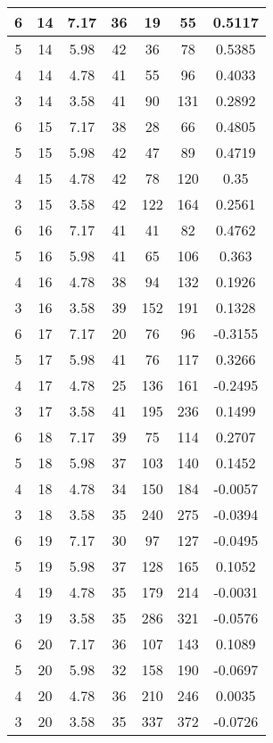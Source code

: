 \documentclass[letterpaper, 12pt]{article}
\begin{document}
\begin{longtable}{|c|c|c|c|c|c|c|}
\hline
6 & 14 & 7.17 & 36 & 19 & 55 & 0.5117 \\
\hline
5 & 14 & 5.98 & 42 & 36 & 78 & 0.5385 \\
\hline
4 & 14 & 4.78 & 41 & 55 & 96 & 0.4033 \\
\hline
3 & 14 & 3.58 & 41 & 90 & 131 & 0.2892 \\
\hline
6 & 15 & 7.17 & 38 & 28 & 66 & 0.4805 \\
\hline
5 & 15 & 5.98 & 42 & 47 & 89 & 0.4719 \\
\hline
4 & 15 & 4.78 & 42 & 78 & 120 & 0.35 \\
\hline
3 & 15 & 3.58 & 42 & 122 & 164 & 0.2561 \\
\hline
6 & 16 & 7.17 & 41 & 41 & 82 & 0.4762 \\
\hline
5 & 16 & 5.98 & 41 & 65 & 106 & 0.363 \\
\hline
4 & 16 & 4.78 & 38 & 94 & 132 & 0.1926 \\
\hline
3 & 16 & 3.58 & 39 & 152 & 191 & 0.1328 \\
\hline
6 & 17 & 7.17 & 20 & 76 & 96 & -0.3155 \\
\hline
5 & 17 & 5.98 & 41 & 76 & 117 & 0.3266 \\
\hline
4 & 17 & 4.78 & 25 & 136 & 161 & -0.2495 \\
\hline
3 & 17 & 3.58 & 41 & 195 & 236 & 0.1499 \\
\hline
6 & 18 & 7.17 & 39 & 75 & 114 & 0.2707 \\
\hline
5 & 18 & 5.98 & 37 & 103 & 140 & 0.1452 \\
\hline
4 & 18 & 4.78 & 34 & 150 & 184 & -0.0057 \\
\hline
3 & 18 & 3.58 & 35 & 240 & 275 & -0.0394 \\
\hline
6 & 19 & 7.17 & 30 & 97 & 127 & -0.0495 \\
\hline
5 & 19 & 5.98 & 37 & 128 & 165 & 0.1052 \\
\hline
4 & 19 & 4.78 & 35 & 179 & 214 & -0.0031 \\
\hline
3 & 19 & 3.58 & 35 & 286 & 321 & -0.0576 \\
\hline
6 & 20 & 7.17 & 36 & 107 & 143 & 0.1089 \\
\hline
5 & 20 & 5.98 & 32 & 158 & 190 & -0.0697 \\
\hline
4 & 20 & 4.78 & 36 & 210 & 246 & 0.0035 \\
\hline
3 & 20 & 3.58 & 35 & 337 & 372 & -0.0726 \\
\hline
\end{longtable}
\end{document}
